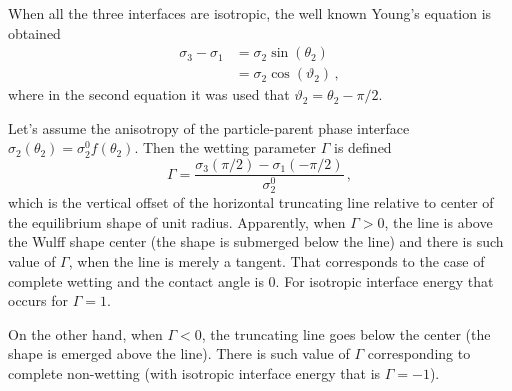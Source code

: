 When all the three interfaces are isotropic, the well known Young's equation is obtained
\begin{align}
    \sigma_3-\sigma_1 &= \sigma_2\sin(\theta_2) \\
        &= \sigma_2\cos(\vartheta_2)
    \,,
\end{align}
where in the second equation it was used that $\vartheta_2=\theta_2-\pi/2$.

Let's assume the anisotropy of the particle-parent phase interface $\sigma_2(\theta_2)=\sigma_2^0f(\theta_2)$. Then the wetting parameter $\Gamma$ is defined
\begin{equation}
    \Gamma = \frac{\sigma_{3}(\pi/2)-\sigma_1(-\pi/2) }{\sigma_2^0} \,,
\end{equation}
which is the vertical offset of the horizontal truncating line relative to center of the equilibrium shape of unit radius. Apparently, when $\Gamma > 0$, the line is above the Wulff shape center (the shape is submerged below the line) and there is such value of $\Gamma$, when the line is merely a tangent. That corresponds to the case of complete wetting and the contact angle is 0. For isotropic interface energy that occurs for $\Gamma=1$.

On the other hand, when $\Gamma < 0$, the truncating line goes below the center (the shape is emerged above the line). There is such value of $\Gamma$ corresponding to complete non-wetting (with isotropic interface energy that is $\Gamma=-1$).


